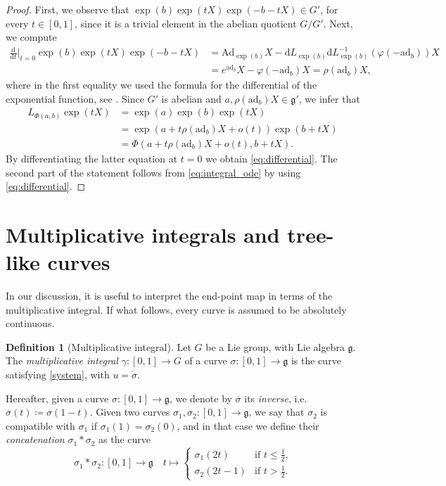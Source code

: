 \documentclass[a4paper,11pt,reqno]{amsart}
\theoremstyle{plain}
\theoremstyle{definition}
\newtheorem{definition}[theorem]{Definition}
\newcommand{\g}{\mathfrak{g}}
\newcommand{\de}{\mathrm{d}}
\newcommand{\Ad}{\mathrm{Ad}}
\newcommand{\ad}{\mathrm{ad}}
\newcommand{\ddt}{\frac{\de}{\de t}}
\begin{document}
\begin{proof}
    First, we observe that $\exp(b)\exp(tX)\exp(-b-tX) \in G'$, for every $t \in [0,1]$, since it is a trivial element in the abelian quotient $G/G'$. Next, we compute
    \begin{align*}
        \ddt \bigg|_{t=0 } \exp(b)\exp(tX)\exp(-b-tX) &= \Ad_{\exp(b)}X - \de L_{\exp(b)} \de L^{-1}_{\exp(b)}\left(\varphi(-\ad_b)\right)X \\
        &= e^{\ad_b}X - \varphi(-\ad_b)X = \rho(\ad_b)X,
    \end{align*}
    where in the first equality we used the formula for the differential of the exponential function, see \cite[Proposition~3.4.2]{hilgert2011structure}. Since $G'$ is abelian and $a, \rho(\ad_b)X \in \g'$, we infer that
    \begin{align*}
        L_{\Phi(a,b)}\exp(tX) &= \exp(a)\exp(b)\exp(tX) \\ &= \exp(a+ t \rho(\ad_b)X + o(t))\exp(b+tX) \\
        &= \Phi(a+ t \rho(\ad_b)X + o(t),b+tX).
    \end{align*}
    By differentiating the latter equation at $t=0$ we obtain \eqref{eq:differential}. The second part of the statement follows from \eqref{eq:integral_ode} by using \eqref{eq:differential}.    
\end{proof}    

\section{Multiplicative integrals and tree-like curves} \label{sec:tree}
In our discussion, it is useful to interpret the end-point map in terms of the multiplicative integral. If what follows, every curve is assumed to be absolutely continuous.

\begin{definition}[Multiplicative integral]
\label{def:multiplicative_integral}
Let $G$ be a Lie group, with Lie algebra $\g$. The \emph{multiplicative integral} $\gamma \colon [0,1] \to G$ of a curve $\sigma \colon [0,1] \to \g$ is the curve satisfying \eqref{system}, with $u = \dot{\sigma}$. 
\end{definition}

Hereafter, given a curve $\sigma \colon [0,1] \to \g$, we denote by $\overline{\sigma}$ its \emph{inverse}, i.e. $\overline{\sigma}(t) \coloneq  \sigma(1-t)$. Given two curves $\sigma_1, \sigma_2 \colon [0,1] \to  \g$, we say that $\sigma_2$ is compatible with $\sigma_1$ if $\sigma_1(1)=\sigma_2(0)$, and in that case we define their \emph{concatenation} $\sigma_1 * \sigma_2$ as the curve
\begin{equation*}
    \sigma_1 * \sigma_2 \colon [0,1]\to \g \quad  t \mapsto \begin{cases}
        \sigma_1(2t)  & \text{if $t \le \tfrac{1}{2}$,} \\ \sigma_2(2t-1) &\text{if $t > \tfrac{1}{2}$.}
    \end{cases}
\end{equation*}
\end{document}
